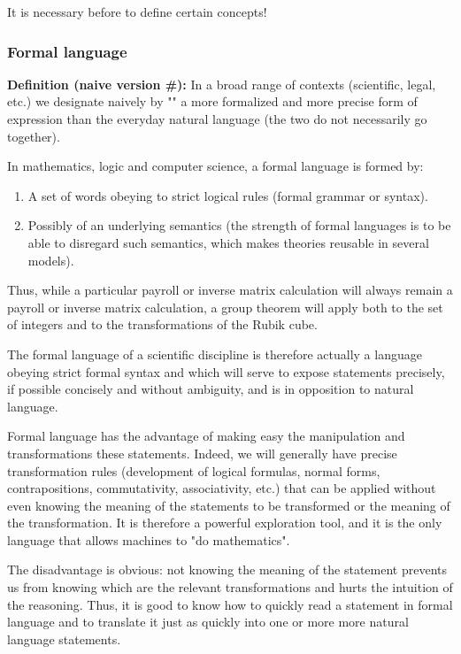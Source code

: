 	It is necessary before to define certain concepts!
	
	\subsubsection{Formal language}
	\textbf{Definition (naive version \#\mydef):} In a broad range of contexts (scientific, legal, etc.) we designate naively by "" a more formalized and more precise form of expression than the everyday natural language (the two do not necessarily go together).
	
	In mathematics, logic and computer science, a formal language is formed by:
	\begin{enumerate}
	 	\item A set of words obeying to strict logical rules (formal grammar or syntax).

		\item Possibly of an underlying semantics (the strength of formal languages is to be able to disregard such semantics, which makes theories reusable in several models).
	\end{enumerate}
	\begin{tcolorbox}[title=Remark,colframe=black,arc=10pt]
	Thus, while a particular payroll or inverse matrix calculation will always remain a payroll or inverse matrix calculation, a group theorem will apply both to the set of integers and to the transformations of the Rubik cube.
	\end{tcolorbox}
	The formal language of a scientific discipline is therefore actually a language obeying strict formal syntax and which will serve to expose statements precisely, if possible concisely and without ambiguity, and is in opposition to natural language.

	Formal language has the advantage of making easy the manipulation and transformations these statements. Indeed, we will generally have precise transformation rules (development of logical formulas, normal forms, contrapositions, commutativity, associativity, etc.) that can be applied without even knowing the meaning of the statements to be transformed or the meaning of the transformation. It is therefore a powerful exploration tool, and it is the only language that allows machines to "do mathematics".

	The disadvantage is obvious: not knowing the meaning of the statement prevents us from knowing which are the relevant transformations and hurts the intuition of the reasoning. Thus, it is good to know how to quickly read a statement in formal language and to translate it just as quickly into one or more more natural language statements.
	
